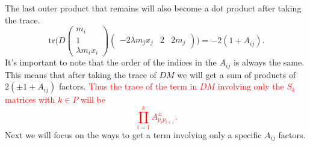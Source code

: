 \documentclass[english,master]{liumaiex}
\theoremstyle{plain}
\theoremstyle{definition}
\newcommand\todo[1]{\textcolor{red}{#1}}
\newcommand{\tr}{\text{tr}}
\begin{document}
The last outer product that remains will also become a dot product after taking the trace.
\begin{equation}
	\tr \Big(
	D
	\begin{pmatrix}
		m_i \\ 1 \\ \lambda m_i x_i
	\end{pmatrix}
	\begin{pmatrix}
		-2\lambda m_j x_j & 2 & 2 m_j
	\end{pmatrix}
	\Big)
	= -2(1 + A_{ij}).
\end{equation}
It's important to note that the order of the indices in the $A_{ij}$ is always the same.
This means that after taking the trace of $DM$ we will get a sum of products of $2(\pm1 + A_{ij})$ factors.
\todo{
Thus the trace of the term in $DM$ involving only the $S_k$ matrices with $k \in P$ will be
\begin{equation}
	\prod_{i = 1}^{k} A_{p_i p_{i+1}}^\pm.
\end{equation}
}
Next we will focus on the ways to get a term involving only a specific $A_{ij}$ factors.
\end{document}

